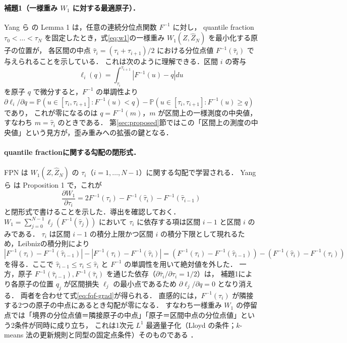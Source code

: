 \documentclass[a4paper,10pt]{jsarticle}
\theoremstyle{definition}
\newcommand{\Wone}{W_1}
\newcommand{\Finv}{F^{-1}}
\newcommand{\Prob}{\mathbb{P}}
\begin{document}
\paragraph{補題1（一様重み $\Wone$ に対する最適原子）．}
Yang ら \cite{yang2019fqf} の Lemma 1 は，任意の連続分位点関数 $\Finv$ に対し，
quantile fraction $\tau_0<\dots<\tau_N$ を固定したとき，式\eqref{eq:w1}の一様重み $\Wone(Z,\hat Z_N)$ を最小化する原子の位置が，
各区間の中点 $\hat\tau_i=(\tau_i+\tau_{i+1})/2$ における分位点値 $\Finv(\hat\tau_i)$ で与えられることを示している．
これは次のように理解できる．区間 $i$ の寄与
\begin{equation}
  \ell_i(q)=\int_{\tau_i}^{\tau_{i+1}}\left|\Finv(u)-q\right|du
\end{equation}
を原子 $q$ で微分すると，$\Finv$ の単調性より $\partial\ell_i/\partial q=\Prob(u\in[\tau_i,\tau_{i+1}]:\Finv(u)<q)-\Prob(u\in[\tau_i,\tau_{i+1}]:\Finv(u)\ge q)$ であり，
これが零になるのは $q=\Finv(m)$，$m$ が区間上の一様測度の中央値，すなわち $m=\hat\tau_i$ のときである．
第\ref{sec:proposed}節ではこの「区間上の測度の中央値」という見方が，歪み重みへの拡張の鍵となる．

\paragraph{quantile fractionに関する勾配の閉形式．}
FPN は $\Wone(Z,\hat Z_N)$ の $\tau_i$（$i=1,\dots,N-1$）に関する勾配で学習される．
Yang ら \cite{yang2019fqf} は Proposition 1 で，これが
\begin{equation}
  \frac{\partial \Wone}{\partial\tau_i}=2\Finv(\tau_i)-\Finv(\hat\tau_i)-\Finv(\hat\tau_{i-1})
  \label{eq:fqf-grad}
\end{equation}
と閉形式で書けることを示した．導出を確認しておく．
$\Wone=\sum_{j=0}^{N-1}\ell_j(\Finv(\hat\tau_j))$ において $\tau_i$ に依存する項は区間 $i-1$ と区間 $i$ のみである．
$\tau_i$ は区間 $i-1$ の積分上限かつ区間 $i$ の積分下限として現れるため，Leibnizの積分則により
\begin{equation}
  \left|\Finv(\tau_i)-\Finv(\hat\tau_{i-1})\right|-\left|\Finv(\tau_i)-\Finv(\hat\tau_i)\right|
  =\left(\Finv(\tau_i)-\Finv(\hat\tau_{i-1})\right)-\left(\Finv(\hat\tau_i)-\Finv(\tau_i)\right)
\end{equation}
を得る．ここで $\hat\tau_{i-1}\le\tau_i\le\hat\tau_i$ と $\Finv$ の単調性を用いて絶対値を外した．
一方，原子 $\Finv(\hat\tau_{i-1}),\Finv(\hat\tau_i)$ を通じた依存（$\partial\hat\tau_i/\partial\tau_i=1/2$）は，
補題1により各原子の位置 $q_j$ が区間損失 $\ell_j$ の最小点であるため $\partial\ell_j/\partial q=0$ となり消える．
両者を合わせて式\eqref{eq:fqf-grad}が得られる．
直感的には，$\Finv(\tau_i)$ が隣接する2つの原子の中点にあるとき勾配が零になる．
すなわち一様重み $\Wone$ の停留点では「境界の分位点値＝隣接原子の中点」「原子＝区間中点の分位点値」という2条件が同時に成り立ち，
これは1次元 $L^1$ 最適量子化（Lloyd の条件；$k$-means 法の更新規則と同型の固定点条件）そのものである \cite{graf2000quantization}．
\end{document}
